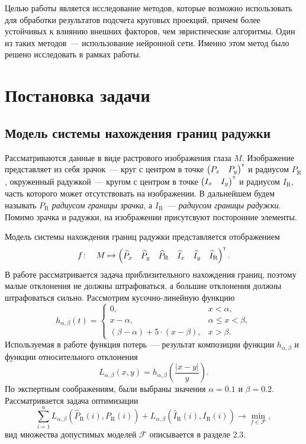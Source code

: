 \documentclass[12pt, twoside]{article}
\begin{document}
Целью работы является исследование методов, которые возможно использовать для обработки результатов подсчета круговых проекций, причем более устойчивых к влиянию внешних факторов, чем эвристические алгоритмы. Один из таких методов~--- использование нейронной сети. Именно этом метод было решено исследовать в рамках работы.

\section{Постановка задачи}
\subsection{Модель системы нахождения границ радужки}

Рассматриваются данные в виде растрового изображения глаза $M$. Изображение представляет из себя зрачок~--- круг с центром в точке $\begin{pmatrix}P_x & P_y\end{pmatrix}^{\text{\tiny\sffamily\upshape\mdseries T}}$ и радиусом $P_\text{R}$, окруженный радужкой~--- кругом с центром в точке $\begin{pmatrix}I_x & I_y\end{pmatrix}^{\text{\tiny\sffamily\upshape\mdseries T}}$ и радиусом $I_\text{R}$, часть которого может отсутствовать на изображении. В дальнейшем будем называть $P_\text{R}$ \textit{радиусом границы зрачка}, а $I_\text{R}$~--- \textit{радиусом границы радужки}. Помимо зрачка и радужки, на изображении присутсвуют посторонние элементы.

Модель системы нахождения границ радужки представляется отображением
\[f\!: \quad M \mapsto \begin{pmatrix}\widehat{P}_x & \widehat{P}_y & \widehat{P}_\text{R} & \widehat{I}_x & \widehat{I}_y & \widehat{I}_\text{R}\end{pmatrix}^{\text{\tiny\sffamily\upshape\mdseries T}}.\]
В работе рассматривается задача приблизительного нахождения границ, поэтому малые отклонения не должны штрафоваться, а большие отклонения должны штрафоваться сильно. Рассмотрим кусочно-линейную функцию
\[
h_{\alpha, \beta}(t) = \begin{cases}0, &x < \alpha, \\ x - \alpha, &\alpha \leqslant x < \beta, \\ (\beta - \alpha) + 5\cdot (x - \beta), & x > \beta.\end{cases}
\]
Используемая в работе функция потерь~--- результат композиции функции $h_{\alpha, \beta}$ и функции относительного отклонения
\[
L_{\alpha, \beta} (x, y) = h_{\alpha, \beta}\left(\frac{|x-y|}{y}\right).
\]
По экспертным соображениям, были выбраны значения $\alpha = 0.1$ и $\beta = 0.2$. Рассматривается задача оптимизации
\begin{equation}\label{mainproblem}
\sum_{i=1}^n L_{\alpha, \beta} \left(\widehat{P}_\text{R}(i), P_\text{R}(i)\right) + L_{\alpha, \beta} \left(\widehat{I}_\text{R}(i), I_\text{R}(i)\right) \to \min_{f\in \mathcal{F}},
\end{equation}
вид множества допустимых моделей $\mathcal{F}$ описывается в разделе 2.3.
\end{document}
